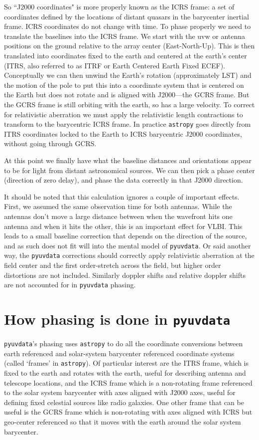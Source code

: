 \documentclass[11pt, oneside]{article}   	%
\begin{document}
So ``J2000 coordinates" is more properly known as the ICRS frame:  a set of coordinates defined by the locations of distant quasars in the barycenter inertial frame. ICRS coordinates do not change with time. To phase properly we need to translate the baselines into the ICRS frame. We start with the uvw or antenna positions on the ground relative to the array center (East-North-Up). This is then translated into coordinates fixed to the earth and centered at the earth's center (ITRS, also referred to as ITRF or Earth Centered Earth Fixed ECEF). Conceptually we can then unwind the Earth's rotation (approximately LST) and the motion of the pole to put this into a coordinate system that is centered on the Earth but does not rotate and is aligned with J2000---the GCRS frame. But the GCRS frame is still orbiting with the earth, so has a large velocity. To correct for relativistic aberration we must apply the relativistic length contractions to transform to the barycentric ICRS frame. In practice \texttt{astropy} goes directly from ITRS coordinates locked to the Earth to ICRS barycentric J2000 coordinates, without going through GCRS.

At this point we finally have what the baseline distances and orientations appear to be for light from distant astronomical sources. We can then pick a phase center (direction of zero delay), and phase the data correctly in that J2000 direction.

It should be noted that this calculation ignores a couple of important effects. First, we assumed the same observation time for both antennas. While the antennas don't move a large distance between when the wavefront hits one antenna and when it hits the other, this is an important effect for VLBI. This leads to a small baseline correction that depends on the direction of the source, and as such does not fit will into the mental model of \texttt{pyuvdata}. Or said another way, the \texttt{pyuvdata} corrections should correctly apply relativistic aberration at the field center and the first order-stretch across the field, but higher order distortions are not included. Similarly doppler shifts and relative doppler shifts are not accounted for in \texttt{pyuvdata} phasing.



\section{How phasing is done in \texttt{pyuvdata}}
\texttt{pyuvdata}'s phasing uses \texttt{astropy} to do all the coordinate conversions between earth referenced and solar-system barycenter referenced coordinate systems (called `frames' in \texttt{astropy}). Of particular interest are the ITRS frame, which is fixed to the earth and rotates with the earth, useful for describing antenna and telescope locations, and the ICRS frame which is a non-rotating frame referenced to the solar system barycenter with axes aligned with J2000 axes, useful for defining fixed celestial sources like radio galaxies. One other frame that can be useful is the GCRS frame which is non-rotating with axes aligned with ICRS but geo-center referenced so that it moves with the earth around the solar system barycenter.
\end{document}
